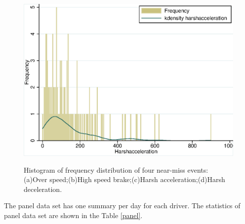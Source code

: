 \documentclass[entropy,article,submit,moreauthors,LaTeX and dvi2pdf]{Definitions/mdpi}
\begin{document}
\begin{figure}[htbp]
{\begin{minipage}[t]{0.45\textwidth}
		\includegraphics[width=1\textwidth]{Figure/Harshacceleration.eps}
		\end{minipage}
		\label{frequency_c}
	}
	\caption{Histogram of frequency distribution of four near-miss events: (a)Over speed;(b)High speed brake;(c)Harsh acceleration;(d)Harsh deceleration.}
	\label{frequency}
\end{figure}
\begin{paracol}{2}
\linenumbers
\switchcolumn
The panel data set has one summary per day for each driver. The statistics of panel data set are shown in the Table \ref{panel}.
\end{paracol}
\end{document}

